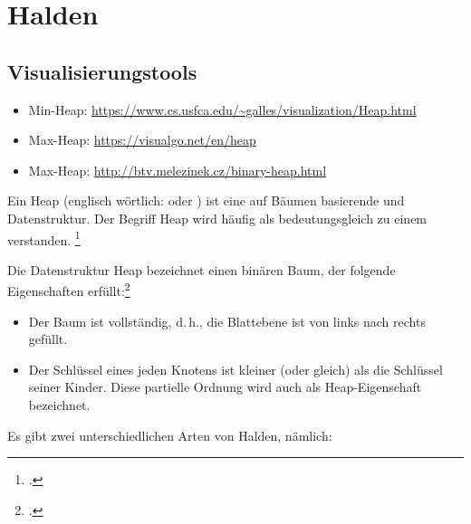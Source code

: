 \documentclass{lehramt-informatik-haupt}
\begin{document}

\chapter{Halden}

\begin{liQuellen}
\item \cite[Seite 25-32]{aud:fs:tafeluebung-11}
\item \cite{wiki:heap}
\item \cite[Seite 407-409 Kapitel 14.6.1]{saake}
\end{liQuellen}

\section{Visualisierungstools}

\begin{itemize}
\item Min-Heap: \url{https://www.cs.usfca.edu/~galles/visualization/Heap.html}
\item Max-Heap: \url{https://visualgo.net/en/heap}
\item Max-Heap: \url{http://btv.melezinek.cz/binary-heap.html}
\end{itemize}

\noindent
Ein Heap (englisch wörtlich:  oder ) ist
eine auf Bäumen basierende  und
 Datenstruktur.
%
Der Begriff Heap wird häufig als bedeutungsgleich zu einem
 verstanden.
\footcite{wiki:heap}

Die Datenstruktur Heap bezeichnet einen binären Baum, der folgende
Eigenschaften erfüllt:\footcite[Seite 407 (PDF 423), Kapitel 14.6.1]{saake}

\begin{itemize}
\item Der Baum ist vollständig, d.\,h., die Blattebene ist von links
nach rechts gefüllt.

\item Der Schlüssel eines jeden Knotens ist kleiner (oder gleich) als
die Schlüssel seiner Kinder. Diese partielle Ordnung wird auch als
Heap-Eigenschaft bezeichnet.
\end{itemize}

Es gibt zwei unterschiedlichen Arten von Halden, nämlich:
\end{document}
